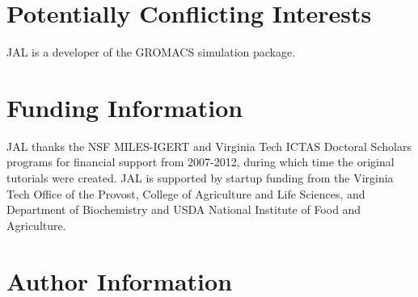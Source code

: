 \documentclass[9pt,tutorial,pubversion]{livecoms}
\begin{document}
\section{Potentially Conflicting Interests}

JAL is a developer of the GROMACS simulation package.

\section{Funding Information}
JAL thanks the NSF MILES-IGERT and Virginia Tech ICTAS Doctoral Scholars programs for financial support from 2007-2012, during which time the original tutorials were created. JAL is supported by startup funding from the Virginia Tech Office of the Provost, College of Agriculture and Life Sciences, and Department of Biochemistry and USDA National Institute of Food and Agriculture.

\section*{Author Information}
\makeorcid




\end{document}
